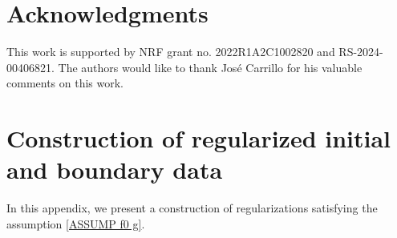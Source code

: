 \documentclass[10pt, reqno]{amsart}
\theoremstyle{plain}
\theoremstyle{definition}
\theoremstyle{remark}
\numberwithin{equation}{section}
\begin{document}
 



%
%
%
%
%
%

\section*{Acknowledgments}
This work is supported by NRF grant no. 2022R1A2C1002820 and RS-2024-00406821. The authors would like to thank Jos\'e Carrillo for his valuable comments on this work. 

%
%
%
%
%
%
\appendix
\section{Construction of regularized initial and boundary data} \label{app: REG INIT}

In this appendix, we present a construction of regularizations satisfying the assumption \eqref{ASSUMP f0 g}.
\end{document}
